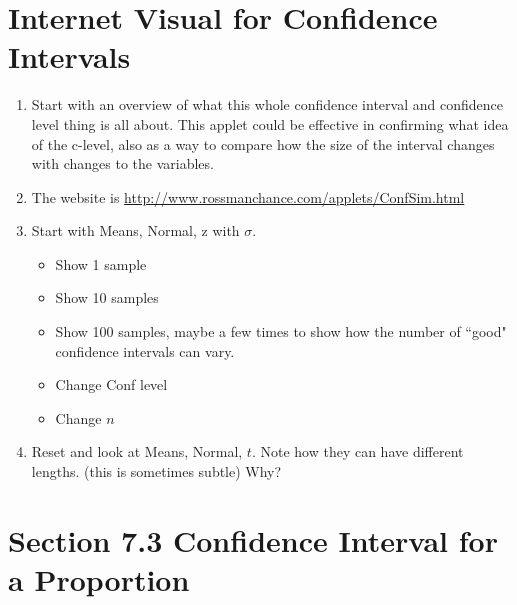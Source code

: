 \documentclass{article}
\begin{document}
\section*{Internet Visual for Confidence Intervals}

\begin{enumerate}

    \item Start with an overview of what this whole confidence interval and confidence level thing is all about. This applet could be effective in confirming what idea of the c-level, also as a way to compare how the size of the interval changes with changes to the variables.
    
    \item The website is \url{http://www.rossmanchance.com/applets/ConfSim.html}
    
    \item Start with Means, Normal, z with $\sigma$.
    
        \begin{itemize}
        
            \item Show 1 sample
            
            \item Show 10 samples
            
            \item Show 100 samples, maybe a few times to show how the number of ``good" confidence intervals can vary.
            
            \item Change Conf level
            
            \item Change $n$
            
        \end{itemize}
        
    \item Reset and look at Means, Normal, $t$. Note how they can have different lengths. (this is sometimes subtle)  Why?
    
\end{enumerate}

\section*{Section 7.3 Confidence Interval for a Proportion}
\end{document}
